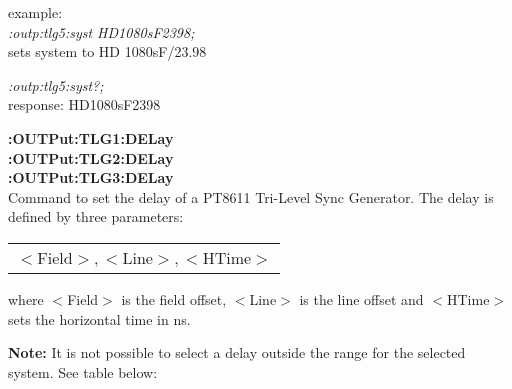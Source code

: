 example:\\
\textit{:outp:tlg5:syst HD1080sF2398;}\\
sets system to HD 1080sF/23.98 

\textit{:outp:tlg5:syst?;}\\
response: HD1080sF2398

\textbf{:OUTPut:TLG1:DELay}\\
\textbf{:OUTPut:TLG2:DELay}\\
\textbf{:OUTPut:TLG3:DELay}\\
Command to set the delay of a PT8611 Tri-Level Sync Generator. The delay is defined by three parameters:

\begin{tabular}{l}
    $<$Field$>,<$Line$>,<$HTime$>$ \\
\end{tabular}

where $<$Field$>$ is the field offset, $<$Line$>$ is the line offset and $<$HTime$>$ sets the horizontal time in ns.

\textbf{Note:} It is not possible to select a delay outside the range for the selected system. See table below:

